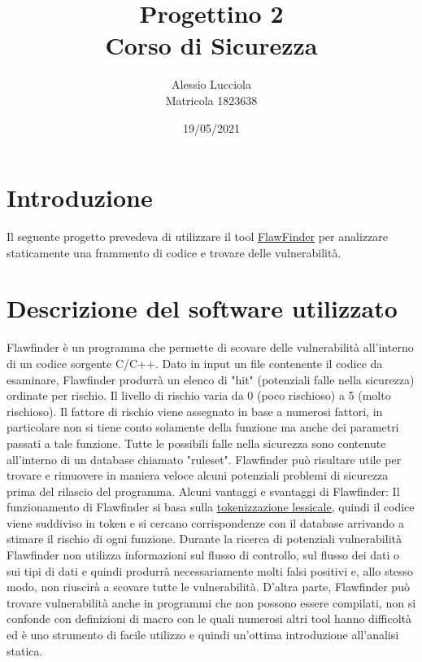 \documentclass[11pt]{article} %
\title{%
 Progettino 2 \\
  \large Corso di Sicurezza}
\author{%
 Alessio Lucciola \\
  \large Matricola 1823638}
\date{19/05/2021}
\begin{document}
\maketitle

\newpage

\tableofcontents
\newpage

\section{Introduzione}

Il seguente progetto prevedeva di utilizzare il tool \href{https://dwheeler.com/flawfinder/}{FlawFinder} per analizzare staticamente una frammento di codice e trovare delle vulnerabilità.

\section{Descrizione del software utilizzato}
Flawfinder è un programma che permette di scovare delle vulnerabilità all'interno di un codice sorgente C/C++. Dato in input un file contenente il codice da esaminare, Flawfinder produrrà un elenco di "hit" (potenziali falle nella sicurezza) ordinate per rischio. Il livello di rischio varia da 0 (poco rischioso) a 5 (molto rischioso). Il fattore di rischio viene assegnato in base a numerosi fattori, in particolare non si tiene conto solamente della funzione ma anche dei parametri passati a tale funzione. Tutte le possibili falle nella sicurezza sono contenute all'interno di un database chiamato "ruleset". Flawfinder può risultare utile per trovare e rimuovere in maniera veloce alcuni potenziali problemi di sicurezza prima del rilascio del programma.\newline
\newline
Alcuni vantaggi e svantaggi di Flawfinder: \newline
Il funzionamento di Flawfinder si basa sulla \href{https://it.other.wiki/wiki/Lexical_analysis}{tokenizzazione lessicale}, quindi il codice viene suddiviso in token e si cercano corrispondenze con il database arrivando a stimare il rischio di ogni funzione. Durante la ricerca di potenziali vulnerabilità Flawfinder non utilizza informazioni sul flusso di controllo, sul flusso dei dati o sui tipi di dati e quindi produrrà necessariamente molti falsi positivi e, allo stesso modo, non riuscirà a scovare tutte le vulnerabilità. \newline
D'altra parte, Flawfinder può trovare vulnerabilità anche in programmi che non possono essere compilati, non si confonde con definizioni di macro con le quali numerosi altri tool hanno difficoltà ed è uno strumento di facile utilizzo e quindi un'ottima introduzione all'analisi statica.
\end{document}
